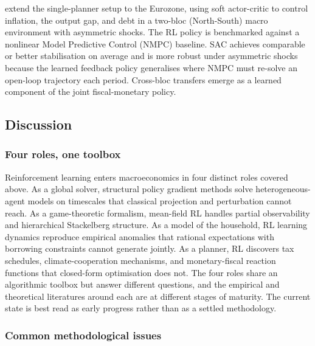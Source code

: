 \citet{Khundadze2025} extend the single-planner setup to the Eurozone,
using soft actor-critic to control inflation, the output gap, and
debt in a two-bloc (North-South) macro environment with asymmetric
shocks. The RL policy is benchmarked against a nonlinear Model
Predictive Control (NMPC) baseline. SAC achieves comparable or better
stabilisation on average and is more robust under asymmetric shocks
because the learned feedback policy generalises where NMPC must
re-solve an open-loop trajectory each period. Cross-bloc transfers
emerge as a learned component of the joint fiscal-monetary policy.

\subsection{Discussion}
\label{sec:macro:discussion}

\subsubsection{Four roles, one toolbox}

Reinforcement learning enters macroeconomics in four distinct roles
covered above. As a global solver, structural policy gradient methods
solve heterogeneous-agent models on timescales that classical
projection and perturbation cannot reach. As a game-theoretic
formalism, mean-field RL handles partial observability and
hierarchical Stackelberg structure. As a model of the household,
RL learning dynamics reproduce empirical anomalies that rational
expectations with borrowing constraints cannot generate jointly.
As a planner, RL discovers tax schedules, climate-cooperation
mechanisms, and monetary-fiscal reaction functions that closed-form
optimisation does not. The four roles share an algorithmic toolbox
but answer different questions, and the empirical and theoretical
literatures around each are at different stages of maturity. The
current state is best read as early progress rather than as a
settled methodology.

\subsubsection{Common methodological issues}
\label{sec:macro:common_issues}

